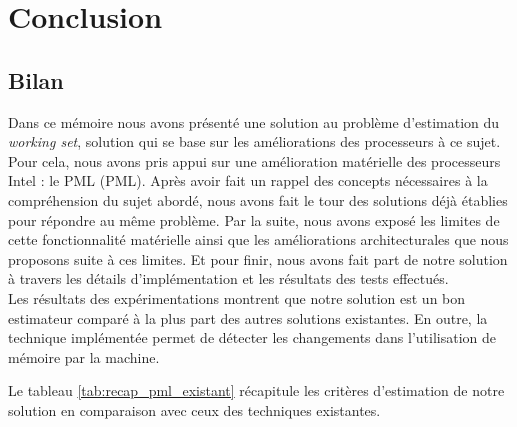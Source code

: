 \let\textcircled=\pgftextcircled
\chapter*{Conclusion}
\label{chap:conclusion}

\section*{Bilan}
Dans ce mémoire nous avons présenté une solution au problème d'estimation du \break \textit{working set}, solution qui se base sur les améliorations des processeurs à ce sujet.\\ Pour cela, nous avons pris appui sur une amélioration matérielle des processeurs Intel : le PML (\acl{PML}). Après avoir fait un rappel des concepts nécessaires à la compréhension du sujet abordé, nous avons fait le tour des solutions déjà établies pour répondre au même problème. Par la suite, nous avons exposé les limites de cette fonctionnalité matérielle ainsi que les améliorations architecturales que nous proposons suite à ces limites. Et pour finir, nous avons fait part de notre solution à travers les détails d'implémentation et les résultats des tests effectués.\\
Les résultats des expérimentations montrent que notre solution est un bon estimateur comparé à la plus part des autres solutions existantes. En outre, la technique implémentée permet de détecter les changements dans l'utilisation de mémoire par la machine.\\
\par \noindent Le tableau \ref{tab:recap_pml_existant} récapitule les critères d'estimation de notre solution en comparaison avec ceux des techniques existantes.

